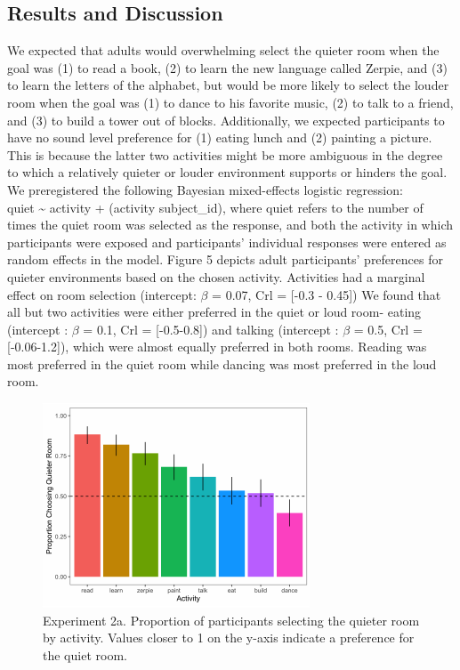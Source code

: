 \documentclass[10pt, letterpaper]{article}
\newenvironment{CodeChunk}{}{}
\begin{document}
\hypertarget{results-and-discussion-2}{%
\subsection{Results and Discussion}\label{results-and-discussion-2}}

We expected that adults would overwhelming select the quieter room when
the goal was (1) to read a book, (2) to learn the new language called
Zerpie, and (3) to learn the letters of the alphabet, but would be more
likely to select the louder room when the goal was (1) to dance to his
favorite music, (2) to talk to a friend, and (3) to build a tower out of
blocks. Additionally, we expected participants to have no sound level
preference for (1) eating lunch and (2) painting a picture. This is
because the latter two activities might be more ambiguous in the degree
to which a relatively quieter or louder environment supports or hinders
the goal. We preregistered the following Bayesian mixed-effects logistic
regression:\\
quiet \textasciitilde{} activity + (activity \textbar{} subject\_id),
where quiet refers to the number of times the quiet room was selected as
the response, and both the activity in which participants were exposed
and participants' individual responses were entered as random effects in
the model. Figure 5 depicts adult participants' preferences for quieter
environments based on the chosen activity. Activities had a marginal
effect on room selection (intercept: \(\beta\) = 0.07, Crl = {[}-0.3 -
0.45{]}) We found that all but two activities were either preferred in
the quiet or loud room- eating (intercept : \(\beta\) = 0.1, Crl =
{[}-0.5-0.8{]}) and talking (intercept : \(\beta\) = 0.5, Crl =
{[}-0.06-1.2{]}), which were almost equally preferred in both rooms.
Reading was most preferred in the quiet room while dancing was most
preferred in the loud room.

\begin{CodeChunk}
\begin{figure}[H]

{\centering \includegraphics{figs/image 5-1} 

}

\caption[Experiment 2a]{Experiment 2a. Proportion of participants selecting the quieter room by activity. Values closer to 1 on the y-axis indicate a preference for the quiet room.}\label{fig:image 5}
\end{figure}
\end{CodeChunk}
\end{document}
